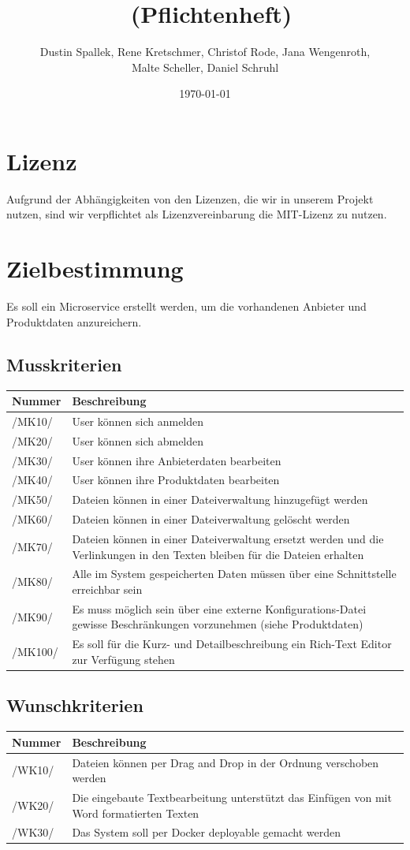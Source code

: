 \documentclass[a4paper,12pt]{article}
\title{\projektName~(Pflichtenheft)}
\author{Dustin Spallek, Rene Kretschmer, Christof Rode, Jana Wengenroth, \\Malte Scheller, Daniel Schruhl}
\date{\today}
\newcommand\addrow[2]{#1 &#2\\ }
\newcommand\addheading[2]{#1 &#2\\ \hline}
\newcommand\tabularhead{\begin{tabular}{lp{13cm}}
\hline
}
\newenvironment{usecase}{\tabularhead}
{\hline\end{tabular}}
\begin{document}
 \setcounter{page}{2}
 \setcounter{tocdepth}{2}
 \tableofcontents          %
 \clearpage

\section{Lizenz}
Aufgrund der Abhängigkeiten von den Lizenzen, die wir in unserem Projekt nutzen, sind wir verpflichtet als Lizenzvereinbarung die MIT-Lizenz zu nutzen.
 
\section{Zielbestimmung}

Es soll ein Microservice erstellt werden, um die vorhandenen Anbieter und Produktdaten anzureichern.

\subsection{Musskriterien}
\begin{usecase}
  \addheading{Nummer}{Beschreibung} 
  \addrow{/MK10/}{User können sich anmelden}
  \addrow{/MK20/}{User können sich abmelden}
  \addrow{/MK30/}{User können ihre Anbieterdaten bearbeiten}
  \addrow{/MK40/}{User können ihre Produktdaten bearbeiten}
  \addrow{/MK50/}{Dateien können in einer Dateiverwaltung hinzugefügt werden}
  \addrow{/MK60/}{Dateien können in einer Dateiverwaltung gelöscht werden}
  \addrow{/MK70/}{Dateien können in einer Dateiverwaltung ersetzt werden und die
   Verlinkungen in den Texten bleiben für die Dateien erhalten}
  \addrow{/MK80/}{Alle im System gespeicherten Daten müssen über eine Schnittstelle erreichbar sein}
  \addrow{/MK90/}{Es muss möglich sein über eine externe Konfigurations-Datei gewisse Beschränkungen vorzunehmen (siehe Produktdaten)}
  \addrow{/MK100/}{Es soll für die Kurz- und Detailbeschreibung ein Rich-Text Editor zur Verfügung stehen}
\end{usecase}

\subsection{Wunschkriterien}
\begin{usecase}
  \addheading{Nummer}{Beschreibung} 
  \addrow{/WK10/}{Dateien können per Drag and Drop in der Ordnung verschoben werden}
  \addrow{/WK20/}{Die eingebaute Textbearbeitung unterstützt das Einfügen von mit Word formatierten Texten}
  \addrow{/WK30/}{Das System soll per Docker deployable gemacht werden}
\end{usecase}
\end{document}
